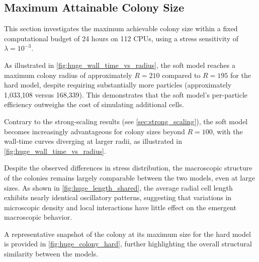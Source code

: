 \documentclass[conference]{IEEEtran}
\begin{document}
\subsection{Maximum Attainable Colony Size}

This section investigates the maximum achievable colony size within a fixed computational budget of 24 hours on 112 CPUs, using a stress sensitivity of $\lambda = 10^{-3}$.

As illustrated in \autoref{fig:huge_wall_time_vs_radius}, the soft model reaches a maximum colony radius of approximately $R = 210$ compared to $R = 195$ for the hard model, despite requiring substantially more particles (approximately 1,033,108 versus 168,339). This demonstrates that the soft model's per-particle efficiency outweighs the cost of simulating additional cells.

Contrary to the strong-scaling results (see \autoref{sec:strong_scaling}), the soft model becomes increasingly advantageous for colony sizes beyond $R = 100$, with the wall-time curves diverging at larger radii, as illustrated in \autoref{fig:huge_wall_time_vs_radius}.

Despite the observed differences in stress distribution, the macroscopic structure of the colonies remains largely comparable between the two models, even at large sizes. As shown in \autoref{fig:huge_length_shared}, the average radial cell length exhibits nearly identical oscillatory patterns, suggesting that variations in microscopic density and local interactions have little effect on the emergent macroscopic behavior.

A representative snapshot of the colony at its maximum size for the hard model is provided in \autoref{fig:huge_colony_hard}, further highlighting the overall structural similarity between the models.
\end{document}

